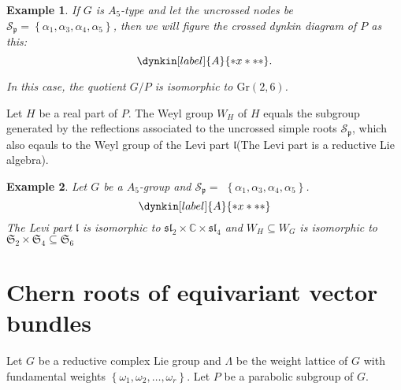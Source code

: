 \documentclass[uplatex,dvipdfmx]{jsarticle}
\newtheorem{example}{Example}[section]
\begin{document}
\begin{example}
    If
    $G$
    is
    $A_5$-type
    and let the uncrossed nodes be
    $\mathcal{S}_{\mathfrak{p}} = \left\{ \alpha_1, \alpha_3, \alpha_4, \alpha_5 \right\}$,
    then we will figure the crossed dynkin diagram of
    $P$
    as this:
    \begin{equation}
        \dynkin[label]{A}{*x***}.
    \end{equation}

    In this case, the quotient
    $G/P$
    is isomorphic to
    $\mathrm{Gr}\left( 2, 6 \right)$.
\end{example}

Let
$H$
be a real part of
$P$.
The Weyl group 
$W_H$
of
$H$
equals the subgroup generated by the reflections associated to the uncrossed simple roots
$\mathcal{S}_\mathfrak{p}$,
which also eqauls to the Weyl group of the Levi part
$\mathfrak{l}$(The Levi part is a reductive Lie algebra).

\begin{example}
    Let 
    $G$ 
    be a 
    $A_5$-group
    and 
    $\mathcal{S}_{\mathfrak{p}} =$    
    $\left\{ \alpha_1, \alpha_3, \alpha_4, \alpha_5 \right\}$.
    \begin{equation*}
        \dynkin[label]{A}{*x***}
    \end{equation*}
    The Levi part
    $\mathfrak{l}$
    is isomorphic to
    $\mathfrak{sl}_2 \times \mathbb{C} \times \mathfrak{sl}_4$
    and
    $W_H \subseteq W_G$
    is isomorphic to
    $\mathfrak{S}_2 \times \mathfrak{S}_4 \subseteq \mathfrak{S}_6$
\end{example}


\section{Chern roots of equivariant vector bundles}


Let
$G$
be a reductive complex Lie group and
$\Lambda$
be the weight lattice of
$G$
with fundamental weights
$\left\{ \omega_1, \omega_2, \ldots, \omega_r \right\}$.
Let
$P$
be a parabolic subgroup of
$G$.
\end{document}
